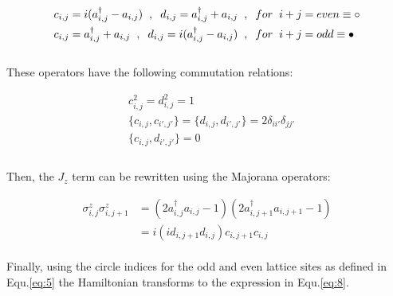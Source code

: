 \documentclass{article}
\begin{document}
\begin{equation}\label{eq:5}
	\begin{aligned}
		c_{i,j} &= i(a^{\dagger}_{i,j} - a_{i,j}) \hspace{2mm},\hspace{2mm} d_{i,j} = a^{\dagger}_{i,j} + a_{i,j} \hspace{2mm},\hspace{2mm} for \hspace{2mm} i+j=even \equiv \circ\\
		c_{i,j} &= a^{\dagger}_{i,j} + a_{i,j} \hspace{2mm},\hspace{2mm} d_{i,j} = i(a^{\dagger}_{i,j} - a_{i,j}) \hspace{2mm},\hspace{2mm} for \hspace{2mm} i+j=odd \equiv \color{black}\bullet\\
	\end{aligned}
\end{equation}\\

\noindent These operators have the following commutation relations:

\begin{equation}\label{eq:6}
	\begin{aligned}
		&c^2_{i,j} = d^2_{i,j} = 1\\
		&\{ c_{i,j},c_{i',j'} \} = \{ d_{i,j},d_{i',j'} \} = 2\delta_{ii'} \delta_{jj'}\\
		&\{ c_{i,j},d_{i',j'} \} = 0\\
	\end{aligned}
\end{equation}\\

\noindent Then, the $J_z$ term can be rewritten using the Majorana operators: 

\begin{equation}\label{eq:7}
	\begin{aligned}
		\sigma^{z}_{i,j}\sigma^{z}_{i,j+1} &=  (2a^{\dagger}_{i,j}a_{i,j} - 1) (2a^{\dagger}_{i,j+1}a_{i,j+1} - 1)\\
		&= i(id_{i,j+1}d_{i,j})c_{i,j+1}c_{i,j} 
	\end{aligned}
\end{equation}\\

\noindent Finally, using the circle indices for the odd and even lattice sites as defined in Equ.\hspace{0.2mm}\ref{eq:5} the Hamiltonian transforms to the expression in Equ.\hspace{0.2mm}\ref{eq:8}.
\end{document}
